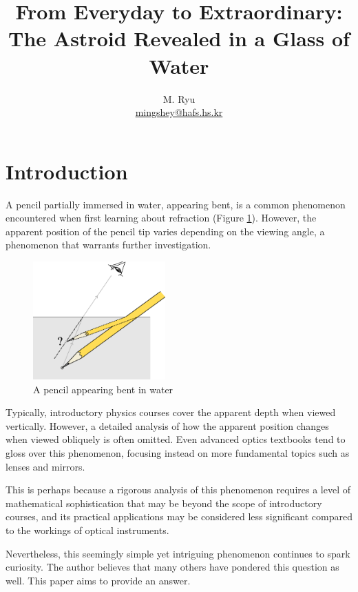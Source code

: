 \documentclass[twocolumn]{article}
\title{From Everyday to Extraordinary:\\ The Astroid Revealed in a Glass of Water}
\author{M. Ryu \\ {\href{mailto:mingshey@hafs.hs.kr}{mingshey@hafs.hs.kr}}}
\begin{document}
\maketitle
%
\newcommand{\romana}{{a}}
\newcommand{\romanb}{{b}}
\newcommand{\romanA}{{A}}
\newcommand{\romanB}{{B}}
\newcommand{\greeka}{{\alpha}}
\newcommand{\greekb}{{\beta}}
\newcommand{\Aprime}{{A^{\prime}}}
\newcommand{\Bprime}{{B^{\prime}}}
%
\section{Introduction}

A pencil partially immersed in water, appearing bent, is a common phenomenon encountered when first learning about refraction (Figure \ref{fig:pencil}). However, the apparent position of the pencil tip varies depending on the viewing angle, a phenomenon that warrants further investigation.

\begin{figure}[ht]
	\centering
	\includegraphics[width=2in]{figs/g164.eps}
	\caption{A pencil appearing bent in water}
	\label{fig:pencil}
\end{figure}

Typically, introductory physics courses cover the apparent depth when viewed vertically. However, a detailed analysis of how the apparent position changes when viewed obliquely is often omitted. Even advanced optics textbooks tend to gloss over this phenomenon, focusing instead on more fundamental topics such as lenses and mirrors.

This is perhaps because a rigorous analysis of this phenomenon requires a level of mathematical sophistication that may be beyond the scope of introductory courses, and its practical applications may be considered less significant compared to the workings of optical instruments. 

Nevertheless, this seemingly simple yet intriguing phenomenon continues to spark curiosity. The author believes that many others have pondered this question as well. This paper aims to provide an answer.
\end{document}
